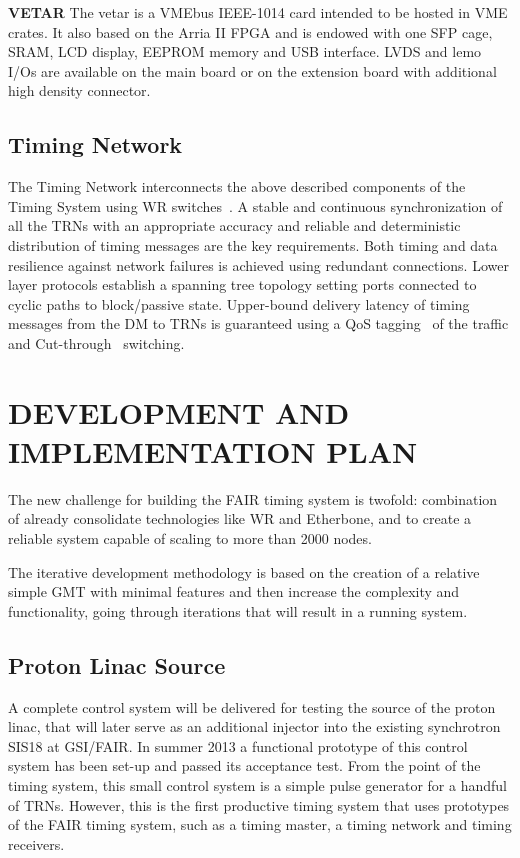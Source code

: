 \documentclass{JAC2003}
\begin{document}
\textbf{VETAR}
The vetar is a VMEbus IEEE-1014 card intended to be hosted in VME crates.
It also based on the Arria II FPGA and is endowed with one SFP cage, SRAM, LCD
display, EEPROM memory and USB interface. LVDS and lemo I/Os are available on the main 
board or on the extension board with additional high density connector.

\subsection{Timing Network}

The Timing Network interconnects the above described components of the Timing
System using WR switches~\cite{wr_switch}. A stable and continuous synchronization of all the
TRNs with an appropriate accuracy and reliable and deterministic distribution 
of timing messages are the key requirements. 
Both timing and data resilience against network failures is achieved 
using redundant connections. Lower layer protocols
establish a spanning tree topology setting ports connected to
cyclic paths to block/passive state. Upper-bound delivery latency of timing messages 
from the DM to TRNs is guaranteed using a QoS tagging~\cite{internet} of the
traffic and Cut-through~\cite{switch} switching.


\section{DEVELOPMENT AND IMPLEMENTATION PLAN}

The new challenge for building the FAIR timing system is
twofold: combination of already consolidate technologies like WR and 
Etherbone, and to create a reliable system capable of scaling
to more than 2000 nodes. 

The iterative development methodology is based on the creation of a relative simple GMT 
with minimal features and then increase the complexity and functionality, going
through iterations that will result in a running system.

\subsection{Proton Linac Source}

A complete control system will  be delivered for testing the source of
the proton linac, that will later serve as an additional injector into
the  existing  synchrotron  SIS18  at  GSI/FAIR.   In  summer  2013  a
functional prototype of this control system has been set-up and passed
its acceptance test.  From the  point of the timing system, this small
control  system is a  simple pulse  generator for  a handful  of TRNs.
However,  this  is  the  first  productive  timing  system  that  uses
prototypes  of the  FAIR timing  system, such  as a  timing  master, a
timing network and timing receivers.
\end{document}
